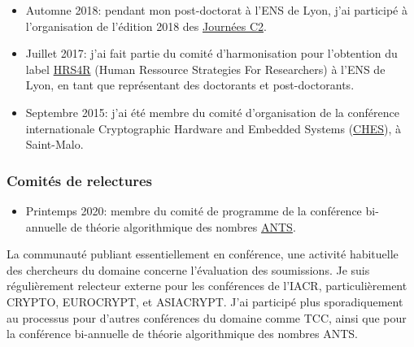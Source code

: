 \documentclass[11pt]{article}
\begin{document}
\begin{itemize}[label = $\bullet$]
  \item Automne 2018: pendant mon post-doctorat à l'ENS de Lyon, j'ai participé à l'organisation de l'édition 2018 des \href{https://jc2-2018.sciencesconf.org/}{Journées C2}.
\item Juillet 2017: j'ai fait partie du comité d'harmonisation pour l'obtention du label \href{https://euraxess.ec.europa.eu/jobs/hrs4r}{HRS4R} (Human Ressource Strategies For Researchers) à l'ENS de Lyon, en tant que représentant des doctorants et post-doctorants. %
\item Septembre 2015: j'ai été membre du comité d'organisation de la conférence internationale Cryptographic Hardware and Embedded Systems (\href{https://ches.iacr.org/2015/}{CHES}), à Saint-Malo. %
\end{itemize}

\subsubsection*{Comités de relectures}

\begin{itemize}[label = $\bullet$]
\item Printemps 2020: membre du comité de programme de la conférence bi-annuelle de théorie algorithmique des nombres \href{https://www.math.auckland.ac.nz/~sgal018/ANTS/}{ANTS}.
\end{itemize}
La communauté publiant essentiellement en conférence, une activité habituelle des chercheurs du domaine concerne l'évaluation des soumissions.
Je suis régulièrement relecteur externe pour les conférences de l'IACR, particulièrement CRYPTO, EUROCRYPT, et ASIACRYPT.
J'ai participé plus sporadiquement au processus pour d'autres conférences du domaine comme TCC, ainsi que pour la conférence bi-annuelle de théorie algorithmique des nombres ANTS.

\end{document}

